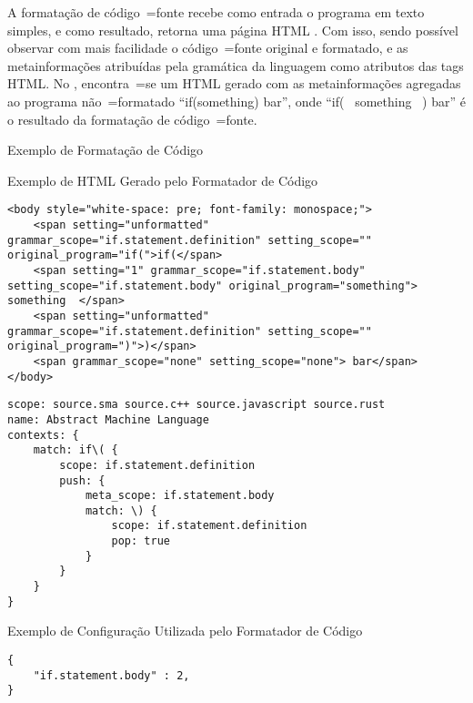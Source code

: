 A formatação de código~=fonte recebe como entrada o programa em texto simples,
e como resultado,
retorna uma página HTML \cite{parallelParserForHTML}.
Com isso,
sendo possível observar com mais facilidade o código~=fonte original e
formatado,
e as metainformações atribuídas pela gramática da linguagem como atributos das tags HTML.
No ,
encontra~=se um HTML gerado com as metainformações agregadas ao programa não~=formatado ``if(something) bar'',
onde ``if( \ something \ ) bar'' é o resultado da formatação de código~=fonte.
\begin{quadro}[!htb]
\caption{Exemplo de Formatação de Código}
\label{exemploDeFormatacaoDeCodigo}
\begin{bluebox}
\begin{code}
\label{exemploDeHTMLGerado}
\caption{Exemplo de HTML Gerado pelo Formatador de Código}
\begin{verbatim}
<body style="white-space: pre; font-family: monospace;">
    <span setting="unformatted" grammar_scope="if.statement.definition" setting_scope="" original_program="if(">if(</span>
    <span setting="1" grammar_scope="if.statement.body" setting_scope="if.statement.body" original_program="something">  something  </span>
    <span setting="unformatted" grammar_scope="if.statement.definition" setting_scope="" original_program=")">)</span>
    <span grammar_scope="none" setting_scope="none"> bar</span>
</body>
\end{verbatim}
\end{code}

\lstset{xleftmargin=2em,aboveskip=0pt}
\begin{lstlisting}[caption={Exemplo de Gramática Utilizada pelo Formatador de Código},label={exemploDeGramaticaUtilizada},style=yaml_style]
scope: source.sma source.c++ source.javascript source.rust
name: Abstract Machine Language
contexts: {
    match: if\( {
        scope: if.statement.definition
        push: {
            meta_scope: if.statement.body
            match: \) {
                scope: if.statement.definition
                pop: true
            }
        }
    }
}
\end{lstlisting}

\begin{code}
\label{exemploDeConfiguracaoUtilizada}
\caption{Exemplo de Configuração Utilizada pelo Formatador de Código}
\begin{verbatim}
{
    "if.statement.body" : 2,
}
\end{verbatim}
\end{code}


\end{bluebox}
\end{quadro}
